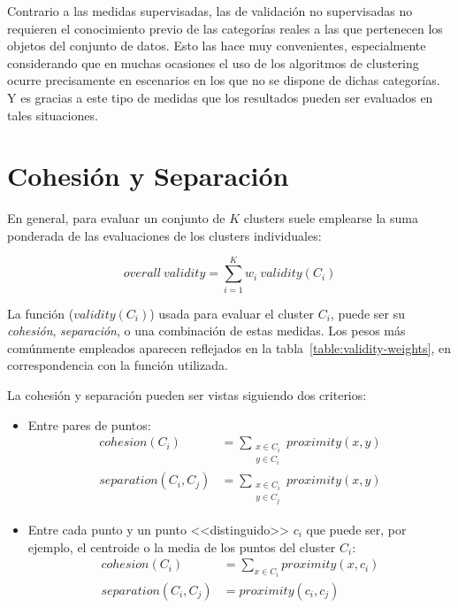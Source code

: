 Contrario a las medidas supervisadas, las de validación no supervisadas no requieren el conocimiento previo de las categorías reales a las que pertenecen los objetos del conjunto de datos.
Esto las hace muy convenientes, especialmente considerando que en muchas ocasiones el uso de los algoritmos de clustering ocurre precisamente en escenarios en los que no se dispone de dichas categorías.
Y es gracias a este tipo de medidas que los resultados pueden ser evaluados en tales situaciones.

\section{Cohesión y Separación}\label{sec:cohesiónYSeparación}

En general, para evaluar un conjunto de $K$ clusters suele emplearse la suma ponderada de las evaluaciones de los clusters individuales:

\begin{equation}
    \label{eq:overall-validity}
    overall\ validity = \sum_{i=1}^{K}{w_i\ validity(C_i)}
\end{equation}

La función ($validity(C_i)$) usada para evaluar el cluster $C_i$, puede ser su \textit{cohesión}, \textit{separación}, o una combinación de estas medidas.
Los pesos más comúnmente empleados aparecen reflejados en la tabla~\ref{table:validity-weights}, en correspondencia con la función utilizada.

La cohesión y separación pueden ser vistas siguiendo dos criterios:

\begin{itemize}
    \item Entre pares de puntos:
    \begin{align}
        cohesion(C_i) & = \sum_{\substack{x\in C_i \\ y\in C_i}}{proximity(x,y)} \\
        separation(C_i, C_j) & = \sum_{\substack{x\in C_i \\ y\in C_j}}{proximity(x,y)}
    \end{align}

    \item Entre cada punto y un punto <<distinguido>> $c_i$ que puede ser, por ejemplo, el centroide o la media de los puntos del cluster $C_i$:
    \begin{align}
        cohesion(C_i) & = \sum_{x\in C_i}{proximity(x,c_i)} \\
        separation(C_i, C_j) & = proximity(c_i,c_j)
    \end{align}
\end{itemize}


